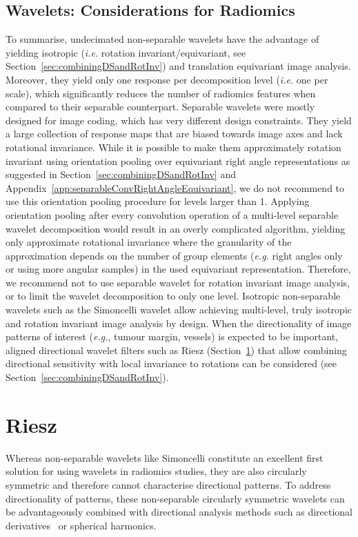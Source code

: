 \documentclass[fleqn,a4paper,oneside,openany]{book}
\begin{document}
\subsection{Wavelets: Considerations for Radiomics}\label{sec:waveletConsiderations}
%
To summarise, undecimated non-separable wavelets have the advantage of yielding isotropic (\textit{i.e.} rotation invariant/equivariant, see Section~\ref{sec:combiningDSandRotInv}) and translation equivariant image analysis. Moreover, they yield only one response per decomposition level (\textit{i.e.} one per scale), which significantly reduces the number of radiomics features when compared to their separable counterpart.
%
Separable wavelets were mostly designed for image coding, which has very different design constraints.
They yield a large collection of response maps that are biased towards image axes and lack rotational invariance.
While it is possible to make them approximately rotation invariant using orientation pooling over equivariant right angle representations as suggested in Section~\ref{sec:combiningDSandRotInv} and Appendix~\ref{app:separableConvRightAngleEquivariant}, we do not recommend to use this orientation pooling procedure for levels larger than 1.
Applying orientation pooling after every convolution operation of a multi-level separable wavelet decomposition would result in an overly complicated algorithm, yielding only approximate rotational invariance where the granularity of the approximation depends on the number of group elements (\emph{e.g.} right angles only or using more angular samples) in the used equivariant representation.
Therefore, we recommend not to use separable wavelet for rotation invariant image analysis, or to limit the wavelet decomposition to only one level.
Isotropic non-separable wavelets such as the Simoncelli wavelet allow achieving multi-level, truly isotropic and rotation invariant image analysis by design.
When the directionality of image patterns of interest (\textit{e.g.}, tumour margin, vessels) is expected to be important, aligned directional wavelet filters such as Riesz (Section~\ref{sec:Riesz}) that allow combining directional sensitivity with local invariance to rotations can be considered (see Section~\ref{sec:combiningDSandRotInv}).
%

\section{Riesz}\label{sec:Riesz}
%
Whereas non-separable wavelets like Simoncelli constitute an excellent first solution for using wavelets in radiomics studies, they are also circularly symmetric and therefore cannot characterise directional patterns.
To address directionality of patterns, these non-separable circularly symmetric wavelets can be advantageously combined with directional analysis methods such as directional derivatives~\cite{Prasanna2014} or spherical harmonics.
\end{document}

